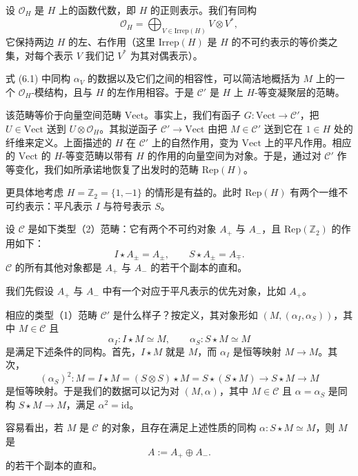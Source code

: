 设 $\mathcal{O}_H$ 是 $H$ 上的函数代数，即 $H$ 的正则表示。我们有同构
\[
\mathcal{O}_H = \bigoplus_{V\in\mathrm{Irrep}(H)} V\otimes V^{*},
\]
它保持两边 $H$ 的左、右作用（这里 $\mathrm{Irrep}(H)$ 是 $H$ 的不可约表示的等价类之集，对每个表示 $V$ 我们记 $V^{*}$ 为其对偶表示）。

式 (6.1) 中同构 $\alpha_V$ 的数据以及它们之间的相容性，可以简洁地概括为 $M$ 上的一个 $\mathcal{O}_H$-模结构，且与 $H$ 的左作用相容。于是 $\mathcal{C}'$ 是 $H$ 上 $H$-等变凝聚层的范畴。

该范畴等价于向量空间范畴 $\mathrm{Vect}$。事实上，我们有函子 $G : \mathrm{Vect}\to\mathcal{C}'$，把 $U\in\mathrm{Vect}$ 送到 $U\otimes\mathcal{O}_H$。其拟逆函子 $\mathcal{C}'\to\mathrm{Vect}$ 由把 $M\in\mathcal{C}'$ 送到它在 $1\in H$ 处的纤维来定义。上面描述的 $H$ 在 $\mathcal{C}'$ 上的自然作用，变为 $\mathrm{Vect}$ 上的平凡作用。相应的 $\mathrm{Vect}$ 的 $H$-等变范畴以带有 $H$ 的作用的向量空间为对象。于是，通过对 $\mathcal{C}'$ 作等变化，我们如所承诺地恢复了出发时的范畴 $\mathrm{Rep}(H)$。


更具体地考虑 $H = \mathbb{Z}_2 = \{1,-1\}$ 的情形是有益的。此时 $\mathrm{Rep}(H)$ 有两个一维不可约表示：平凡表示 $I$ 与符号表示 $S$。

设 $\mathcal{C}$ 是如下类型（2）范畴：它有两个不可约对象 $A_+$ 与 $A_-$，且 $\mathrm{Rep}(\mathbb{Z}_2)$ 的作用如下：
\begin{equation}\tag{6.3}
I\star A_\pm = A_\pm,\qquad S\star A_\pm = A_\mp.
\end{equation}
$\mathcal{C}$ 的所有其他对象都是 $A_+$ 与 $A_-$ 的若干个副本的直和。

我们先假设 $A_+$ 与 $A_-$ 中有一个对应于平凡表示的优先对象，比如 $A_+$。

相应的类型（1）范畴 $\mathcal{C}'$ 是什么样子？按定义，其对象形如 $(M,(\alpha_I,\alpha_S))$，其中 $M\in\mathcal{C}$ 且
\[
\alpha_I : I\star M\simeq M,\qquad \alpha_S : S\star M\simeq M
\]
是满足下述条件的同构。首先，$I\star M$ 就是 $M$，而 $\alpha_I$ 是恒等映射 $M\to M$。其次，
\[
(\alpha_S)^2 : M = I\star M = (S\otimes S)\star M = S\star(S\star M)\to S\star M\to M
\]
是恒等映射。于是我们的数据可以记为对 $(M,\alpha)$，其中 $M\in\mathcal{C}$ 且 $\alpha = \alpha_S$ 是同构 $S\star M\to M$，满足 $\alpha^2 = \mathrm{id}$。

容易看出，若 $M$ 是 $\mathcal{C}$ 的对象，且存在满足上述性质的同构 $\alpha : S\star M\simeq M$，则 $M$ 是
\[
A := A_+\oplus A_-.
\]
的若干个副本的直和。

